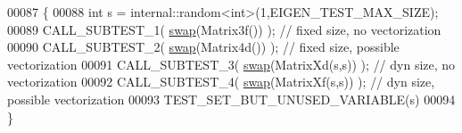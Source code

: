 \begin{DoxyCode}
00087 \{
00088   \textcolor{keywordtype}{int} s = internal::random<int>(1,EIGEN\_TEST\_MAX\_SIZE);
00089   CALL\_SUBTEST\_1( \hyperlink{endian_8c_a3ca5ecd34b04d6a243c054ac3a57f68d}{swap}(Matrix3f()) ); \textcolor{comment}{// fixed size, no vectorization }
00090   CALL\_SUBTEST\_2( \hyperlink{endian_8c_a3ca5ecd34b04d6a243c054ac3a57f68d}{swap}(Matrix4d()) ); \textcolor{comment}{// fixed size, possible vectorization }
00091   CALL\_SUBTEST\_3( \hyperlink{endian_8c_a3ca5ecd34b04d6a243c054ac3a57f68d}{swap}(MatrixXd(s,s)) ); \textcolor{comment}{// dyn size, no vectorization }
00092   CALL\_SUBTEST\_4( \hyperlink{endian_8c_a3ca5ecd34b04d6a243c054ac3a57f68d}{swap}(MatrixXf(s,s)) ); \textcolor{comment}{// dyn size, possible vectorization }
00093   TEST\_SET\_BUT\_UNUSED\_VARIABLE(s)
00094 \}
\end{DoxyCode}
